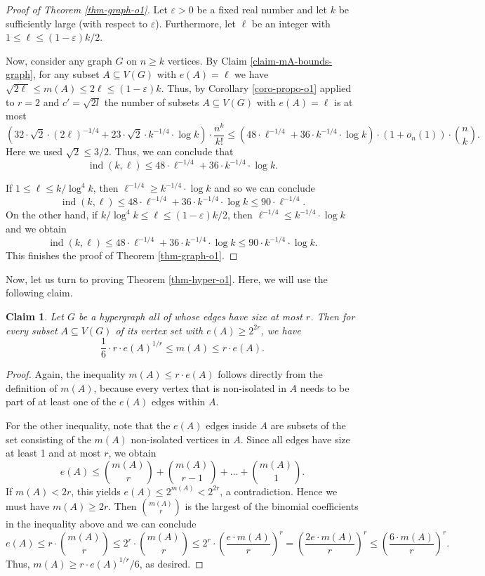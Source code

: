\documentclass[11pt]{article}
\newtheorem{claim}[theorem]{Claim}
\theoremstyle{definition}
\numberwithin{equation}{section}
\begin{document}
\begin{proof}[Proof of Theorem  \ref{thm-graph-o1}]Let $\varepsilon>0$ be a fixed real number and let $k$ be sufficiently large (with respect to $\varepsilon$). Furthermore, let $\ell$ be an integer with $1 \leq \ell\leq (1-\varepsilon)k/2$.

Now, consider any graph $G$ on $n\geq k$ vertices. By Claim \ref{claim-mA-bounds-graph}, for any subset $A\subseteq V(G)$ with $e(A)=\ell$ we have $\sqrt{2\ell}\leq m(A)\leq 2\ell\leq  (1-\varepsilon)k$. Thus, by Corollary \ref{coro-propo-o1} applied to $r=2$ and $c'=\sqrt{2l}$ the number of subsets $A\subseteq V(G)$ with $e(A)=\ell$ is at most
\[\left(32\cdot \sqrt{2}\cdot (2\ell)^{-1/4}+23 \cdot \sqrt{2}\cdot k^{-1/4}\cdot \log k\right)\cdot \frac{n^k}{k!}\leq \left(48\cdot \ell^{-1/4}+36 \cdot k^{-1/4}\cdot \log k\right)\cdot (1+o_n(1))\cdot {n\choose k}.\]
Here we used $\sqrt{2}\leq 3/2$. Thus, we can conclude that
\[\operatorname{ind}(k,\ell)\leq 48\cdot \ell^{-1/4}+36 \cdot k^{-1/4}\cdot \log k.\]

If $1\leq \ell\leq k/\log^4 k$, then $\ell^{-1/4}\geq k^{-1/4}\cdot \log k$ and so we can conclude
\[\operatorname{ind}(k,\ell)\leq 48\cdot \ell^{-1/4}+36 \cdot k^{-1/4}\cdot \log k\leq 90\cdot \ell^{-1/4}.\]
On the other hand, if $k/\log^4 k \leq \ell\leq (1-\varepsilon)k/2$, then $\ell^{-1/4}\leq k^{-1/4}\cdot \log k$ and we obtain
\[\operatorname{ind}(k,\ell)\leq 48\cdot \ell^{-1/4}+36 \cdot k^{-1/4}\cdot \log k\leq 90\cdot k^{-1/4}\cdot \log k.\] 
This finishes the proof of Theorem \ref{thm-graph-o1}.
\end{proof}

Now, let us turn to proving Theorem \ref{thm-hyper-o1}. Here, we will use the following claim.

\begin{claim}\label{claim-mA-bounds-hyper} Let $G$ be a hypergraph all of whose edges have size at most $r$. Then for every subset $A\subseteq V(G)$ of its vertex set with $e(A)\geq 2^{2r}$, we have
\[\frac{1}{6}\cdot r\cdot e(A)^{1/r}\leq m(A)\leq r\cdot e(A).\]
\end{claim}
\begin{proof}Again, the inequality $m(A)\leq r\cdot e(A)$ follows directly from the definition of $m(A)$, because every vertex that is non-isolated in $A$ needs to be part of at least one of the $e(A)$ edges within $A$.

For the other inequality, note that the $e(A)$ edges inside $A$ are subsets of the set consisting of the $m(A)$ non-isolated vertices in $A$. Since all edges have size at least 1 and at most $r$, we obtain
\[e(A)\leq {m(A)\choose r}+{m(A)\choose r-1}+\dots+{m(A)\choose 1}.\]
If $m(A)<2r$, this yields $e(A)\leq 2^{m(A)}<2^{2r}$, a contradiction. Hence we must have $m(A)\geq 2r$. Then ${m(A)\choose r}$ is the largest of the binomial coefficients in the inequality above and we can conclude
\[e(A)\leq r\cdot {m(A)\choose r}\leq 2^r\cdot {m(A)\choose r}\leq 2^r\cdot\left(\frac{e\cdot m(A)}{r}\right)^{r}=\left(\frac{2e\cdot m(A)}{r}\right)^{r}\leq \left(\frac{6\cdot m(A)}{r}\right)^{r}.\]
Thus, $m(A)\geq  r\cdot e(A)^{1/r}/6$, as desired.
\end{proof}
\end{document}
